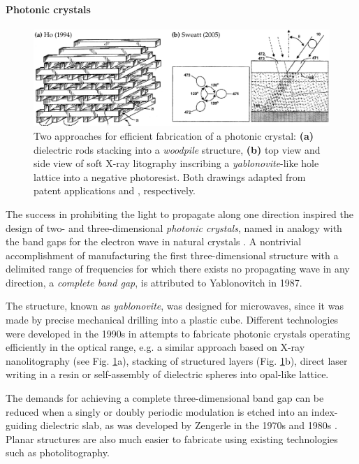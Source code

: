 \paragraph{Photonic crystals}%
\begin{figure}[t] \caption{Two approaches for efficient fabrication of a photonic crystal: \textbf{(a)} dielectric rods stacking into a \textit{woodpile} structure, \textbf{(b)} top view and side view of soft X-ray litography inscribing a \textit{yablonovite}-like hole lattice into a negative photoresist. Both drawings adapted from patent applications  \cite{ho1994periodic} and \cite{sweatt2005method}, respectively.} \label{fg_phc_patents} \centering \includegraphics[width=\textwidth]{img/patents/phc_patents.pdf} \end{figure}
The success in prohibiting the light to propagate along one direction inspired the design of two- and three-dimensional \textit{photonic crystals}, named in analogy with the band gaps for the electron wave in natural crystals \cite{joannopoulos2011photonic}. A nontrivial accomplishment of manufacturing the first three-dimensional structure with a delimited range of frequencies for which there exists no propagating wave in any direction, a \textit{complete band gap}, is attributed to Yablonovitch \cite{yablonovitch1987} in 1987.

The structure, known as \textit{yablonovite}, was designed for microwaves, since it was made by precise mechanical drilling into a plastic cube. Different technologies were developed in the 1990s in attempts to fabricate photonic crystals operating  efficiently in the optical range, e.g. a similar approach based on X-ray nanolitography (see Fig. \ref{fg_phc_patents}a), stacking of structured layers (Fig. \ref{fg_phc_patents}b), direct laser writing in a resin or self-assembly of dielectric spheres into opal-like lattice.

The demands for achieving a complete three-dimensional band gap can be reduced when a singly or doubly periodic modulation is etched into an index-guiding dielectric slab, as was developed by Zengerle in the 1970s and 1980s \cite{zengerle1987light}. Planar structures are also much easier to fabricate using existing technologies such as photolitography.  

